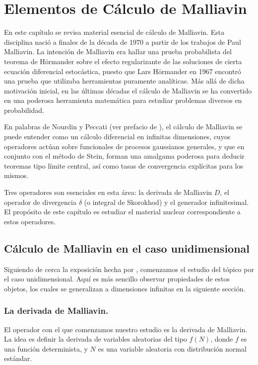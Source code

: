 \documentclass[letterpaper,twoside,12pt]{book}
\newcommand{\1}{\mathds{1}}
\theoremstyle{definition}
\theoremstyle{definition}
\theoremstyle{remark}
\theoremstyle{definition}
\theoremstyle{definition}
\theoremstyle{definition}
\theoremstyle{definition}
\theoremstyle{definition}
\begin{document}
\chapter{Elementos de Cálculo de Malliavin}%
En este capítulo se revisa material esencial de cálculo de Malliavin. Esta disciplina nació a finales de la década de 1970 a partir de los trabajos de Paul Malliavin. La intención de Malliavin era hallar una prueba probabilista del teorema de Hörmander sobre el efecto regularizante de las soluciones de cierta ecuación diferencial estocástica, puesto que Lars Hörmander en 1967 encontró una prueba que utilizaba herramientas puramente analíticas. Más allá de dicha motivación inicial, en las últimas décadas el cálculo de Malliavin se ha convertido en una poderosa herramienta matemática para estudiar problemas diversos en probabilidad. 

En palabras de Nourdin y Peccati (ver prefacio de \cite{Nourdin_Peccati_2012}), el cálculo de Malliavin se puede entender como un cálculo diferencial en infinitas dimensiones, cuyos operadores actúan sobre funcionales de procesos gaussianos generales, y que en conjunto con el método de Stein, forman una amalgama poderosa para deducir teoremas tipo límite central, así como tasas de convergencia explícitas para los mismos. 

Tres operadores son esenciales en esta área: la derivada de Malliavin $D$, el operador de divergencia $\delta$ (o integral de Skorokhod) y el generador infinitesimal. El propósito de este capítulo es estudiar el material nuclear correspondiente a estos operadores.
\section{Cálculo de Malliavin en el caso unidimensional}
Siguiendo de cerca la exposición hecha por \cite{Nourdin_Peccati_2012}, comenzamos el estudio del tópico por el caso unidimensional. Aquí es más sencillo observar propiedades de estos objetos, los cuales se generalizan a dimensiones infinitas en la siguiente sección.

\subsection{La derivada de Malliavin.}

El operador con el que comenzamos nuestro estudio es la derivada de Malliavin. La idea es definir la derivada de variables aleatorias del tipo $f(N)$, donde $f$ es una función determinista, y $N$ es una variable aleatoria con distribución normal estándar.
\end{document}
